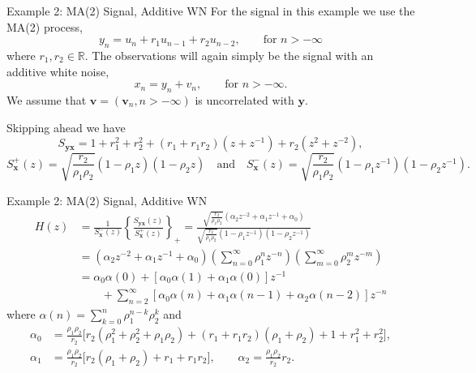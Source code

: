 \documentclass{beamer}  %
\newcommand{\R}{\mathbb{R}}
\begin{document}


\begin{frame}{Example 2: MA(2) Signal, Additive WN}
	For the signal in this example we use the MA(2) process,
	$$y_n = u_n + r_1u_{n-1} + r_2u_{n-2}, \qquad \text{for } n > -\infty$$
	where $r_1,r_2\in \R$.  The observations will again simply be the signal with an additive white noise,
	$$x_n = y_n + v_n, \qquad \text{for } n > -\infty.$$
	We assume that $\textbf{v} = (\textbf{v}_n ,  n > -\infty)$ is uncorrelated with $\textbf{y}$. 
	
	
	\bigskip
	
	Skipping ahead we have 
	$$S_{\textbf{yx}} = 1 + r_1^2 + r_2^2 + (r_1 + r_1r_2)(z + z^{-1}) + r_2(z^2 + z^{-2}),$$
	$$S^+_{\textbf{x}}(z) = \sqrt{\frac{r_2}{\rho_1\rho_2}}  (1-\rho_1 z)(1-\rho_2 z)\quad\text{and}\quad S^-_{\textbf{x}}(z) = \sqrt{\frac{r_2}{\rho_1\rho_2}}  (1-\rho_1 z^{-1})(1-\rho_2 z^{-1}).$$
	
\end{frame}	


\begin{frame}{Example 2: MA(2) Signal, Additive WN}
	\vspace{-.7cm}\begin{align*}
	H(z) &= \frac{1}{S^-_{\textbf{x}}(z)} \left\{\frac{S_{\textbf{yx}}(z)}{S^+_{\textbf{x}}(z)}\right\}_+ = \frac{\sqrt{\frac{r_2}{\rho_1\rho_2}}(\alpha_2 z^{-2} + \alpha_1 z^{-1} + \alpha_0)}{\sqrt{\frac{r_2}{\rho_1\rho_2}}  (1-\rho_1 z^{-1})(1-\rho_2 z^{-1})}\\
	& = (\alpha_2 z^{-2} + \alpha_1 z^{-1} + \alpha_0)\left(\sum_{n=0}^\infty \rho_1^nz^{-n}\right)
	\left(\sum_{m=0}^\infty \rho_2^mz^{-m}\right)\\
	&=  \alpha_0\alpha(0) + [\alpha_0\alpha(1) + \alpha_1\alpha(0)]z^{-1} \\
		&\qquad + \sum_{n=2}^\infty [\alpha_0\alpha(n)+\alpha_1\alpha(n-1)+\alpha_2\alpha(n-2)]z^{-n}
	\end{align*}
	where
	$\alpha(n) = \displaystyle \sum_{k=0}^n \rho_1^{n-k}\rho_2^k $\quad
	and 
	\begin{align*}
	\alpha_0 &= \frac{\rho_1\rho_2}{r_2}\big[r_2(\rho_1^2 + \rho_2^2 + \rho_1\rho_2) + (r_1 + r_1r_2)(\rho_1 + \rho_2) + 1 + r_1^2  + r_2^2\big],\\
	\alpha_1 &=  \frac{\rho_1\rho_2}{r_2}\big[r_2(\rho_1+\rho_2) + r_1 +r_1 r_2\big],\qquad  \alpha_2 = \frac{\rho_1\rho_2}{r_2}r_2.
	\end{align*}
\end{frame}	
\end{document}
